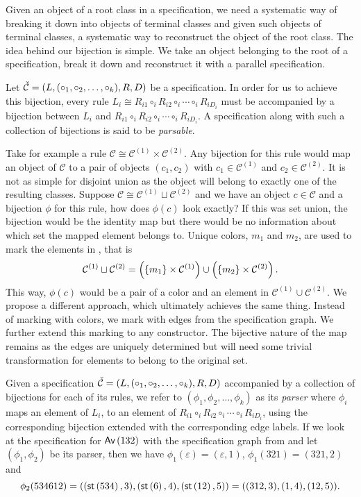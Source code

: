 \label{ch:pbijection}

Given an object of a root class in a specification, we need a systematic way of breaking it down into objects of terminal classes and given such objects of terminal classes, a systematic way to reconstruct the object of the root class. The idea behind our bijection is simple. We take an object belonging to the root of a specification, break it down and reconstruct it with a parallel specification.

Let $\check{\mathcal{C}} = (L,(\circ_1,\circ_2,\dotsc,\circ_k),R,D)$ be a specification. In order for us to achieve this bijection, every rule $L_i \cong R_{i1} \circ_i R_{i2} \circ_i \dotsm \circ_i R_{iD_i}$ must be accompanied by a bijection between $L_i$ and $R_{i1} \circ_i R_{i2} \circ_i \dotsm \circ_i R_{iD_i}$. A specification along with such a collection of bijections is said to be \emph{parsable}.

Take for example a rule $\mathcal{C} \cong \mathcal{C}^{(1)} \times \mathcal{C}^{(2)}$. Any bijection for this rule would map an object of $\mathcal{C}$ to a pair of objects $(c_1,c_2)$ with $c_1 \in \mathcal{C}^{(1)}$ and $c_2 \in \mathcal{C}^{(2)}$. It is not as simple for disjoint union as the object will belong to exactly one of the resulting classes. Suppose $\mathcal{C} \cong \mathcal{C}^{(1)} \sqcup \mathcal{C}^{(2)}$ and we have an object $c\in\mathcal{C}$ and a bijection $\phi$ for this rule, how does $\phi(c)$ look exactly? If this was set union, the bijection would be the identity map but there would be no information about which set the mapped element belongs to. Unique colors, $m_1$ and $m_2$, are used to mark the elements in , that is
\[
    \mathcal{C}^{(1)} \sqcup \mathcal{C}^{(2)} = \left(\left\{m_1\right\} \times \mathcal{C}^{(1)}\right) \cup \left(\left\{m_2\right\} \times \mathcal{C}^{(2)}\right).
\]
This way, $\phi(c)$ would be a pair of a color and an element in $\mathcal{C}^{(1)} \cup \mathcal{C}^{(2)}$. We propose a different approach, which ultimately achieves the same thing. Instead of marking with colors, we mark with edges from the specification graph. We further extend this marking to any constructor. The bijective nature of the map remains as the edges are uniquely determined but will need some trivial transformation for elements to belong to the original set.

Given a specification $\check{\mathcal{C}} = (L,(\circ_1,\circ_2,\dotsc,\circ_k),R,D)$ accompanied by a collection of bijections for each of its rules, we refer to $(\phi_1,\phi_2,\dotsc,\phi_k)$ as its \emph{parser} where $\phi_i$ maps an element of $L_i$, to an element of $R_{i1} \circ_i R_{i2} \circ_i \dotsm \circ_i R_{iD_i}$, using the corresponding bijection extended with the corresponding edge labels. If we look at the specification for $\textsf{Av}\left(132\right)$ with the specification graph from  and let $(\phi_1,\phi_2)$ be its parser, then we have $\phi_1(\varepsilon) = (\varepsilon, 1)$, $\phi_1(321) = (321, 2)$ and 
\[
    \phi_2(534612) = ((\textsf{st}\left(534\right),3), (\textsf{st}\left(6\right),4), (\textsf{st}\left(12\right),5)) = ((312,3), (1,4), (12,5)).
\]

